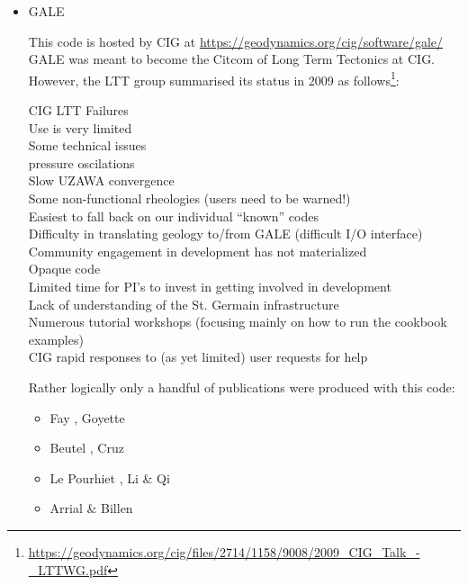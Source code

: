 \begin{itemize}
\item {\codefont GALE} 

This code is hosted by CIG at \url{https://geodynamics.org/cig/software/gale/}
GALE was meant to become the Citcom of Long Term Tectonics at CIG. However, 
the LTT group summarised its status in 2009 as 
follows\footnote{\url{https://geodynamics.org/cig/files/2714/1158/9008/2009_CIG_Talk_-_LTTWG.pdf}}:

\hspace{1cm}
\begin{minipage}[t]{0.75\textwidth}
CIG LTT Failures\\
Use is very limited\\
Some technical issues\\
pressure oscilations\\
Slow UZAWA convergence\\
Some non-functional rheologies (users need to be warned!)\\
Easiest to fall back on our individual “known” codes\\
Difficulty in translating geology to/from GALE (difficult I/O interface)\\
Community engagement in development has not materialized \\
Opaque code\\
Limited time for PI’s to invest in getting involved in development\\
Lack of understanding of the St. Germain infrastructure\\
Numerous tutorial workshops (focusing mainly on how to run the cookbook examples)\\
CIG rapid responses to (as yet limited) user requests for help
\end{minipage}

Rather logically only a handful of publications were produced with this code:

\begin{scriptsize}
\begin{itemize}
\item[\twothousandeight] Fay \etal \cite{fabs08}, Goyette \etal \cite{gotc08}
\item[\twothousandten] Beutel \etal \cite{beve10}, Cruz \etal \cite{crmw10}
\item[\twothousandtwelve] Le Pourhiet \etal \cite{lehm12}, Li \& Qi \cite{liqi12}
\item[\twothousandthirteen] Arrial \& Billen \cite{arbi13}
\end{itemize}
\end{scriptsize}


\end{itemize}
